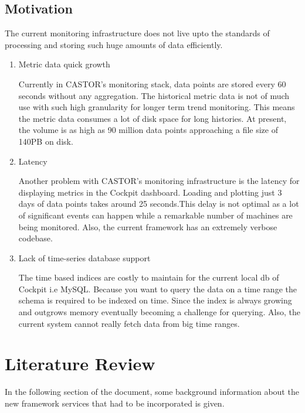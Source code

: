 \documentclass[11pt, letterpaper]{article}            %
\begin{document}
\subsection{Motivation}
The current monitoring infrastructure does not live upto the standards of processing and storing such huge amounts of data efficiently. 
\begin{enumerate}
	\item Metric data quick growth
	
	Currently in CASTOR’s monitoring stack, data points are stored every 60 seconds without any aggregation. The historical metric data is not of much use  with such high granularity for longer term trend monitoring.  This means the metric data consumes a lot of disk space for long histories. At present, the volume is as high as 90 million data points approaching a file size of 140PB on disk. 
	
	\item Latency
	
	 Another problem with CASTOR’s monitoring infrastructure is the latency for displaying metrics in the Cockpit dashboard.  Loading and plotting just 3 days of data points takes around 25 seconds.This delay is not optimal as a lot of  significant events can happen while a remarkable number of machines are being monitored. Also, the current framework has an extremely verbose codebase.
	 
	\item Lack of time-series database support
	
	The time based indices are costly to maintain for the current local db of Cockpit i.e MySQL.  Because you want to query the data on a time range the schema is required to be indexed on time. Since the index is always growing and outgrows memory eventually becoming a challenge for querying. Also, the current system cannot really fetch data from big time ranges. 
	
	
\end{enumerate}

\section{Literature Review}
In the following section of the document, some background information about the new framework services that had to be incorporated is given. 
\end{document}
